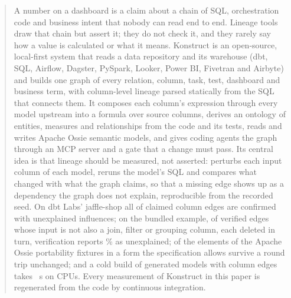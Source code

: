 \begin{abstract}
A number on a dashboard is a claim about a chain of SQL, orchestration code and business intent
that nobody can read end to end. Lineage tools draw that chain but assert it; they do not check it,
and they rarely say how a value is calculated or what it means. Konstruct is an open-source,
local-first system that reads a data repository and its warehouse (dbt, SQL, Airflow, Dagster,
PySpark, Looker, Power BI, Fivetran and Airbyte) and builds one graph of every relation, column,
task, test, dashboard and business term, with column-level lineage parsed statically from the SQL
that connects them. It composes each column's expression through every model upstream into a
formula over source columns, derives an ontology of entities, measures and relationships from the
code and its tests, reads and writes Apache Ossie semantic models, and gives coding agents the
graph through an MCP server and a gate that a change must pass. Its central idea is that lineage
should be measured, not asserted:  perturbs each input column of each
model, reruns the model's SQL and compares what changed with what the graph claims, so that a
missing edge shows up as a dependency the graph does not explain, reproducible from the recorded
seed. On dbt Labs' jaffle-shop all \jsConfirmed{} of \jsClaimed{} claimed column edges are
confirmed with \jsUnexplained{} unexplained influences; on the bundled example, of
\exDeletedEdges{} verified edges whose input is not also a join, filter or grouping column, each
deleted in turn, verification reports \exDeletedEdgesPct{}\% as unexplained; \ossieNamedPortable{}
of the \ossieNamedElements{} elements of the Apache Ossie portability fixtures in a form the
specification allows survive a round trip unchanged; and a cold build of \perfLargestModels{}
generated models with \perfLargestEdges{} column edges takes \perfLargestCold{}~s on
\machineCores{} CPUs. Every measurement of Konstruct in this paper is regenerated from the code by
continuous integration.
\end{abstract}
